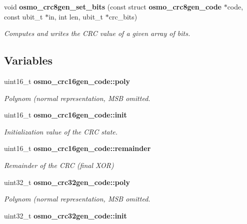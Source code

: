 \begin{DoxyCompactItemize}
void {\bf osmo\_\-crc8gen\_\-set\_\-bits} (const struct {\bf osmo\_\-crc8gen\_\-code} $\ast$code, const ubit\_\-t $\ast$in, int len, ubit\_\-t $\ast$crc\_\-bits)
\begin{DoxyCompactList}\small\item\em Computes and writes the CRC value of a given array of bits. \item\end{DoxyCompactList}\end{DoxyCompactItemize}
\subsection*{Variables}
\begin{DoxyCompactItemize}
\item 
uint16\_\-t {\bf osmo\_\-crc16gen\_\-code::poly}\label{group__crcgen_gaedd08f5b95d016f3f09fc8bd7941c4e3}

\begin{DoxyCompactList}\small\item\em Polynom (normal representation, MSB omitted. \item\end{DoxyCompactList}\item 
uint16\_\-t {\bf osmo\_\-crc16gen\_\-code::init}\label{group__crcgen_gaecf697df2c87f82d77273fc3170f06b2}

\begin{DoxyCompactList}\small\item\em Initialization value of the CRC state. \item\end{DoxyCompactList}\item 
uint16\_\-t {\bf osmo\_\-crc16gen\_\-code::remainder}\label{group__crcgen_gaeff1e62578a8f7b2474aa8765b9b874d}

\begin{DoxyCompactList}\small\item\em Remainder of the CRC (final XOR) \item\end{DoxyCompactList}\item 
uint32\_\-t {\bf osmo\_\-crc32gen\_\-code::poly}\label{group__crcgen_ga38fbc53e41d3181a2123c62253f9ee25}

\begin{DoxyCompactList}\small\item\em Polynom (normal representation, MSB omitted. \item\end{DoxyCompactList}\item 
uint32\_\-t {\bf osmo\_\-crc32gen\_\-code::init}\label{group__crcgen_gad139d035aff276d724db17c41b2147d8}


\end{DoxyCompactItemize}
